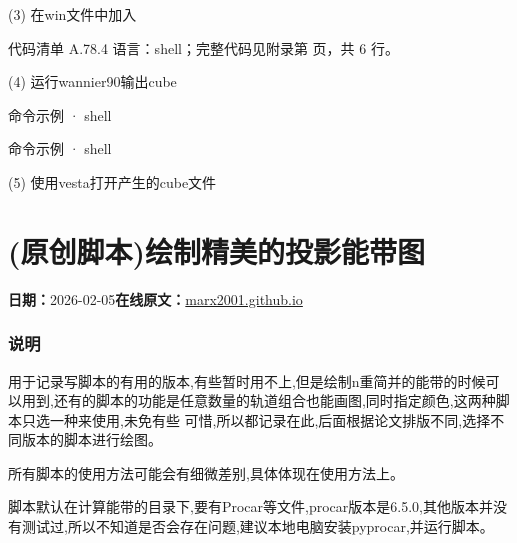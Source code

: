 \documentclass[lang=cn,scheme=chinese,color=blue,device=normal,toc=onecol,math=cm]{elegantbook}
\begin{document}
(3) 在win文件中加入\par


\begin{codeindexbox}{代码清单 A.78.4}
语言：shell；完整代码见附录第 \pageref{code:78:4} 页，共 6 行。
\end{codeindexbox}


(4) 运行wannier90输出cube\par


\begin{inlinecodebox}{命令示例 · shell}
\end{inlinecodebox}


\begin{inlinecodebox}{命令示例 · shell}
\end{inlinecodebox}


(5) 使用vesta打开产生的cube文件\par



\section{(原创脚本)绘制精美的投影能带图}
\begin{articlemeta}
\textbf{日期：}2026-02-05\hfill\textbf{在线原文：}\href{https://marx2001.github.io/sci-note\_posts/20260205-fatband}{marx2001.github.io}
\end{articlemeta}

\subsubsection{说明}


用于记录写脚本的有用的版本,有些暂时用不上,但是绘制n重简并的能带的时候可以用到,还有的脚本的功能是任意数量的轨道组合也能画图,同时指定颜色,这两种脚本只选一种来使用,未免有些 可惜,所以都记录在此,后面根据论文排版不同,选择不同版本的脚本进行绘图。\par


所有脚本的使用方法可能会有细微差别,具体体现在使用方法上。\par


脚本默认在计算能带的目录下,要有Procar等文件,procar版本是6.5.0,其他版本并没有测试过,所以不知道是否会存在问题,建议本地电脑安装pyprocar,并运行脚本。\par
\end{document}
